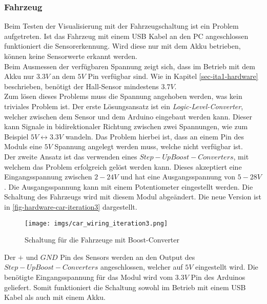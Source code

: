 \documentclass[.../Dokumentation.tex]{subfiles}
\begin{document}
   	\subsubsection*{Fahrzeug}
   	Beim Testen der Visualisierung mit der Fahrzeugschaltung ist ein Problem aufgetreten. Ist das Fahrzeug mit einem USB Kabel an den PC angeschlossen funktioniert die Sensorerkennung. Wird diese nur mit dem Akku betrieben, können keine Sensorwerte erkannt werden.\\
   	Beim Ausmessen der verfügbaren Spannung zeigt sich, dass im Betrieb mit dem Akku nur $3.3V$ an dem $5V$ Pin verfügbar sind. Wie in Kapitel \ref{sec-ita1-hardware} beschrieben, benötigt der Hall-Sensor mindestens $3.7V$.\\
   	Zum lösen dieses Problems muss die Spannung angehoben werden, was kein triviales Problem ist. Der erste Lösungsansatz ist ein \emph{Logic-Level-Converter}, welcher zwischen dem Sensor und dem Arduino eingebaut werden kann. Dieser kann Signale in bidirektionaler Richtung zwischen zwei Spannungen, wie zum Beispiel $5V \longleftrightarrow 3.3V$ wandeln. Das Problem hierbei ist, dass an einem Pin des Moduls eine $5V$ Spannung angelegt werden muss, welche nicht verfügbar ist.\\
   	Der zweite Ansatz ist das verwenden eines $Step-Up Boost-Converters$, mit welchem das Problem erfolgreich gelöst werden kann.
   	Dieses akzeptiert eine Eingangsspannung zwischen $2-24V$ und hat eine Ausgangsspannung von $5-28V$. Die Ausgangsspannung kann mit einem Potentiometer eingestellt werden. Die Schaltung des Fahrzeugs wird mit diesem Modul abgeändert. Die neue Version ist in \autoref{fig-hardware-car-iteration3} dargestellt.
   	\begin{figure}[H]
   		\begin{center}
   			\texttt{[image: imgs/car\_wiring\_iteration3.png]}
   			\caption{Schaltung für die Fahrzeuge mit Boost-Converter}
   			\label{fig-hardware-car-iteration3}
   		\end{center}
   	\end{figure}
   \noindent
   	Der $+$ und $GND$ Pin des Sensors werden an den Output des $Step-Up Boost-Converters$ angeschlossen, welcher auf $5V$ eingestellt wird. Die benötigte Eingangsspannung für das Modul wird vom $3.3V$ Pin des Arduinos geliefert. Somit funktioniert die Schaltung sowohl im Betrieb mit einem USB Kabel als auch mit einem Akku. 
    
    
\end{document}
